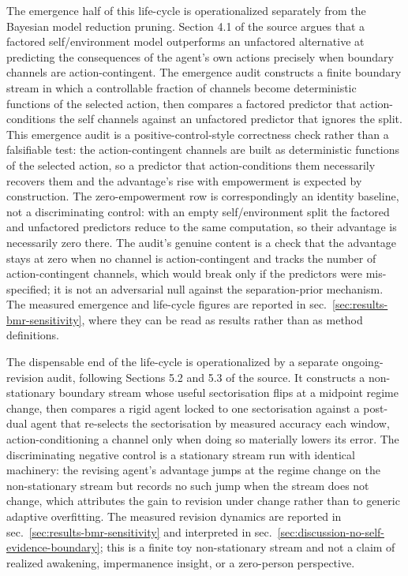 \documentclass[
]{article}
\begin{document}
The emergence half of this life-cycle is operationalized separately from
the Bayesian model reduction pruning. Section 4.1 of the source argues
that a factored self/environment model outperforms an unfactored
alternative at predicting the consequences of the agent's own actions
precisely when boundary channels are action-contingent. The emergence
audit constructs a finite boundary stream in which a controllable
fraction of channels become deterministic functions of the selected
action, then compares a factored predictor that action-conditions the
self channels against an unfactored predictor that ignores the split.
This emergence audit is a positive-control-style correctness check
rather than a falsifiable test: the action-contingent channels are built
as deterministic functions of the selected action, so a predictor that
action-conditions them necessarily recovers them and the advantage's
rise with empowerment is expected by construction. The zero-empowerment
row is correspondingly an identity baseline, not a discriminating
control: with an empty self/environment split the factored and
unfactored predictors reduce to the same computation, so their advantage
is necessarily zero there. The audit's genuine content is a check that
the advantage stays at zero when no channel is action-contingent and
tracks the number of action-contingent channels, which would break only
if the predictors were mis-specified; it is not an adversarial null
against the separation-prior mechanism. The measured emergence and
life-cycle figures are reported in
sec.~\ref{sec:results-bmr-sensitivity}, where they can be read as
results rather than as method definitions.

The dispensable end of the life-cycle is operationalized by a separate
ongoing-revision audit, following Sections 5.2 and 5.3 of the source. It
constructs a non-stationary boundary stream whose useful sectorisation
flips at a midpoint regime change, then compares a rigid agent locked to
one sectorisation against a post-dual agent that re-selects the
sectorisation by measured accuracy each window, action-conditioning a
channel only when doing so materially lowers its error. The
discriminating negative control is a stationary stream run with
identical machinery: the revising agent's advantage jumps at the regime
change on the non-stationary stream but records no such jump when the
stream does not change, which attributes the gain to revision under
change rather than to generic adaptive overfitting. The measured
revision dynamics are reported in sec.~\ref{sec:results-bmr-sensitivity}
and interpreted in sec.~\ref{sec:discussion-no-self-evidence-boundary};
this is a finite toy non-stationary stream and not a claim of realized
awakening, impermanence insight, or a zero-person perspective.
\end{document}
